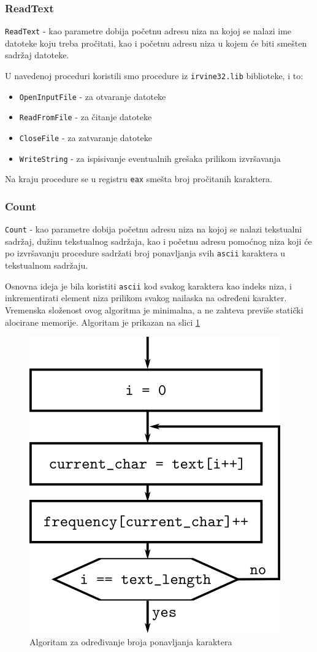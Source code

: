 \documentclass[a4paper, 12pt]{article}
\begin{document}
\subsubsection*{\textsf{ReadText}}

\verb|ReadText| - kao parametre dobija početnu adresu niza na kojoj se nalazi ime datoteke koju treba pročitati, kao i početnu adresu niza u kojem će biti smešten sadržaj datoteke. 

U navedenoj proceduri koristili smo procedure iz \verb|irvine32.lib| biblioteke, i to: 
\begin{itemize}
\setlength\itemsep{0.1em}
\item \verb|OpenInputFile| - za otvaranje datoteke
\item \verb|ReadFromFile| - za čitanje datoteke
\item \verb|CloseFile| - za zatvaranje datoteke
\item \verb|WriteString| - za ispisivanje eventualnih grešaka prilikom izvršavanja
\end{itemize}
Na kraju procedure se u registru \verb|eax| smešta broj pročitanih karaktera.

\subsubsection*{\textsf{Count}}

\verb|Count| - kao parametre dobija početnu adresu niza na kojoj se nalazi tekstualni sadržaj, dužinu tekstualnog sadržaja, kao i početnu adresu pomoćnog niza koji će po izvršavanju procedure sadržati broj ponavljanja svih \verb|ascii| karaktera u tekstualnom sadržaju.

Osnovna ideja je bila koristiti \verb|ascii| kod svakog karaktera kao indeks niza, i inkrementirati element niza prilikom svakog nailaska na određeni karakter. Vremenska složenost ovog algoritma je minimalna, a ne zahteva previše statički alocirane memorije. Algoritam je prikazan na slici \ref{count}

\begin{figure}[h!]
\centering
\includegraphics[width=.35\textwidth]{count}
\caption{Algoritam za određivanje broja ponavljanja karaktera}
\label{count}
\end{figure}
\end{document}
